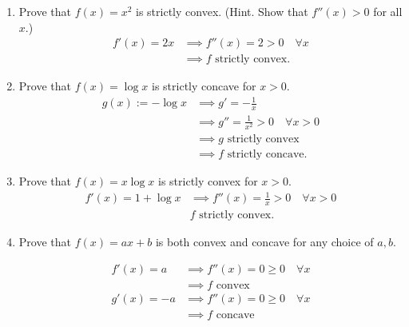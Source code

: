 \documentclass[12pt]{article}
\begin{document}
\begin{enumerate}[1.]
	      \begin{enumerate}
		      \item Prove that $f(x)=x^2$ is strictly convex. (Hint. Show that $f''(x)> 0$ for all $x$.)
		            \color{blue}
		            \begin{align*}
			            f'(x) = 2x & \implies f''(x) = 2 > 0 \quad \forall x \\
			                       & \implies f \text{ strictly convex.}
		            \end{align*}
		            \color{black}
		      \item Prove that $f(x)=\log x$ is strictly concave for $x > 0$.
		            \color{blue}
		            \begin{align*}
			            g(x) := -\log x & \implies g' = -\frac{1}{x}                           \\
			                            & \implies g'' = \frac{1}{x^2} > 0 \quad \forall x > 0 \\
			                            & \implies g \text{ strictly convex}                   \\
			                            & \implies f \text{ strictly concave.}
		            \end{align*}
		            \color{black}
		      \item Prove that $f(x)=x\log x$ is strictly convex for $x > 0$.
		            \color{blue}
		            \begin{align*}
			            f'(x) = 1 + \log x & \implies f''(x) = \frac{1}{x} > 0 \quad \forall x > 0 \\
			                               & f \text{ strictly convex.}
		            \end{align*}
		            \color{black}
		      \item Prove that $f(x)=ax+b$ is both convex and concave for any choice of $a,b$.

		            \color{blue}
		            \begin{align*}
			            f'(x) = a  & \implies f''(x) = 0 \geq 0 \quad \forall x \\
			                       & \implies f \text{ convex}                  \\
			            g'(x) = -a & \implies f''(x) = 0 \geq 0 \quad \forall x \\
			                       & \implies f \text{ concave}
		            \end{align*}
		            \color{black}
	      \end{enumerate}


\end{enumerate}
\end{document}
